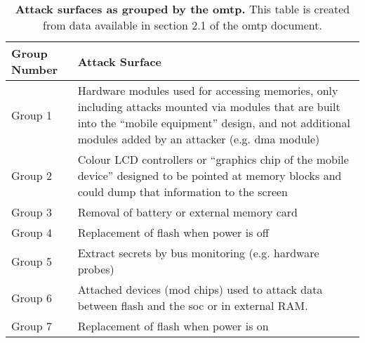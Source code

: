 \begin{table}[ht]
\centering
\begin{tabular}{|p{2cm}|p{12cm}|}
\hline
\textbf{Group Number} & \textbf{Attack Surface} \\ \hline
Group 1 & Hardware modules used for accessing memories, only including attacks mounted via modules that are built into the ``mobile equipment'' design, and not additional modules added by an attacker (e.g. \gls{dma} module) \\ \hline
Group 2 & Colour LCD controllers or ``graphics chip of the mobile device'' designed to be pointed at memory blocks and could dump that information to the screen\\ \hline
Group 3 & Removal of battery or external memory card \\ \hline
Group 4 & Replacement of flash when power is off \\ \hline
Group 5 & Extract secrets by bus monitoring (e.g. hardware probes) \\ \hline
Group 6 & Attached devices (mod chips) used to attack data between flash and the \gls{soc} or in external RAM. \\ \hline
Group 7 & Replacement of flash when power is on \\ \hline
\end{tabular}
\caption[OMTP Threat Groups]{\textbf{Attack surfaces as grouped by the \gls{omtp}.} This table is created from data available in section 2.1 of the \gls{omtp} document. \cite{Confidential2009}}
\label{table:omtp_threat_groups}
\end{table}
